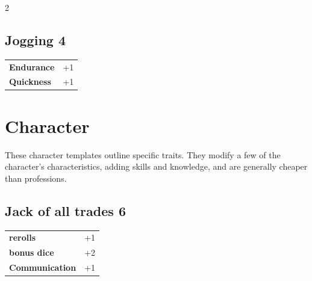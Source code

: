\begin{multicols}{2}
\begin{tcolorbox}
\end{tcolorbox}

\begin{tcolorbox}
    \subsection*{Jogging \hfill \small{4 }}
    \tcblower




\begin{tabular}{@{}ll@{}}
    \textbf{Endurance} & +1\\
    \textbf{Quickness} & +1\\
\end{tabular}


\end{tcolorbox}

\section{Character}

These character templates outline specific traits. They modify a few of the character's characteristics, adding skills and knowledge, and are generally cheaper than professions.

\begin{tcolorbox}
    \subsection*{Jack of all trades \hfill \small{6 }}
    \tcblower




\begin{tabular}{@{}ll@{}}
    \textbf{rerolls} & +1\\
    \textbf{bonus dice} & +2\\
    \textbf{Communication} & +1\\
\end{tabular}



\end{tcolorbox}
\end{multicols}
